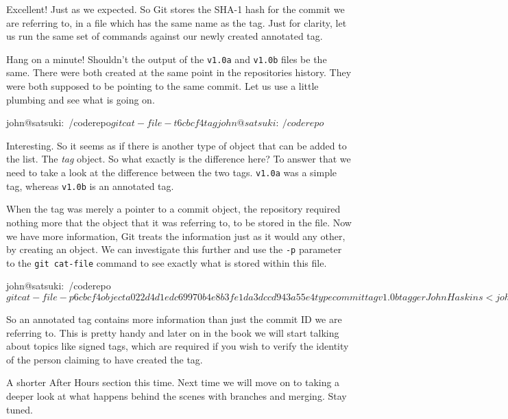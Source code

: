 Excellent!  Just as we expected.  So Git stores the SHA-1 hash for the commit we are referring to, in a file which has the same name as the tag.  Just for clarity, let us run the same set of commands against our newly created annotated tag.


Hang on a minute!  Shouldn't the output of the \texttt{v1.0a} and \texttt{v1.0b} files be the same.  There were both created at the same point in the repositories history.  They were both supposed to be pointing to the same commit.  Let us use a little plumbing and see what is going on.

\begin{code}
john@satsuki:~/coderepo$ git cat-file -t 6cbcf4
tag
john@satsuki:~/coderepo$ 
\end{code}

Interesting.  So it seems as if there is another type of object that can be added to the list.  The \emph{tag} object.  So what exactly is the difference here?  To answer that we need to take a look at the difference between the two tags.  \texttt{v1.0a} was a simple tag, whereas \texttt{v1.0b} is an annotated tag.  

When the tag was merely a pointer to a commit object, the repository required nothing more that the object that it was referring to, to be stored in the file.  Now we have more information, Git treats the information just as it would any other, by creating an object.  We can investigate this further and use the \texttt{-p} parameter to the \texttt{git cat-file} command to see exactly what is stored within this file.

\begin{code}
john@satsuki:~/coderepo$ git cat-file -p 6cbcf4
object a022d4d1edc69970b4e8b3fe1da3dccd943a55e4
type commit
tag v1.0b
tagger John Haskins <john.haskins@tamagoyakiinc.koala> 
 Thu Mar 31 23:55:50 2011 +0100

This is an annotated tag
john@satsuki:~/coderepo$ 
\end{code}

So an annotated tag contains more information than just the commit ID we are referring to.  This is pretty handy and later on in the book we will start talking about topics like signed tags, which are required if you wish to verify the identity of the person claiming to have created the tag.

A shorter After Hours section this time.  Next time we will move on to taking a deeper look at what happens behind the scenes with branches and merging.  Stay tuned.
